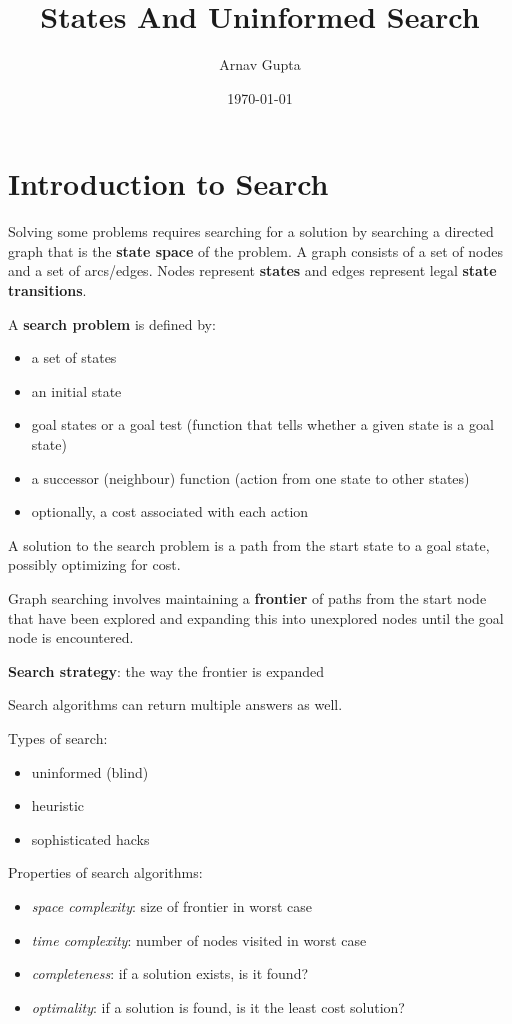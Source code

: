 \documentclass[11pt]{article}
\author{Arnav Gupta}
\date{\today}
\title{States And Uninformed Search}
\begin{document}
\maketitle
\tableofcontents

\section{Introduction to Search}
\label{sec:org4afc4ee}
Solving some problems requires searching for a solution by searching a directed graph that is
the \textbf{state space} of the problem.
A graph consists of a set of nodes and a set of arcs/edges.
Nodes represent \textbf{states} and edges represent legal \textbf{state transitions}.

A \textbf{search problem} is defined by:
\begin{itemize}
\item a set of states
\item an initial state
\item goal states or a goal test (function that tells whether a given state is a goal state)
\item a successor (neighbour) function (action from one state to other states)
\item optionally, a cost associated with each action
\end{itemize}

A solution to the search problem is a path from the start state to a goal state, possibly
optimizing for cost.

Graph searching involves maintaining a \textbf{frontier} of paths from the start node that have been explored
and expanding this into unexplored nodes until the goal node is encountered.

\textbf{Search strategy}: the way the frontier is expanded

Search algorithms can return multiple answers as well.

Types of search:
\begin{itemize}
\item uninformed (blind)
\item heuristic
\item sophisticated hacks
\end{itemize}

Properties of search algorithms:
\begin{itemize}
\item \emph{space complexity}: size of frontier in worst case
\item \emph{time complexity}: number of nodes visited in worst case
\item \emph{completeness}: if a solution exists, is it found?
\item \emph{optimality}: if a solution is found, is it the least cost solution?
\end{itemize}
\end{document}
